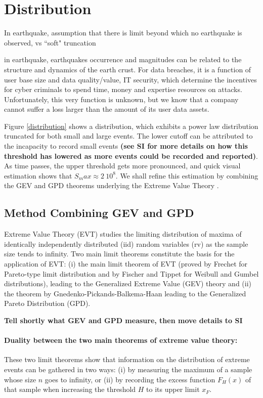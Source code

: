 \section*{Distribution}

In earthquake, assumption that there is limit beyond which no earthquake is observed, vs ``soft" truncation

in earthquake, earthquakes occurrence and magnitudes can be related to the structure and dynamics of the earth crust. For data breaches, it is a function of user base size and data quality/value, IT security, which determine the incentives for cyber criminals to spend time, money and expertise resources on attacks. Unfortunately, this very function is unknown, but we know that a company cannot suffer a loss larger than the amount of its user data assets.

Figure \ref{distribution} shows a distribution, which exhibits a power law distribution truncated for both small and large events. The lower cutoff can be attributed to the incapacity to record small events {\bf (see SI for more details on how this threshold has lowered as more events could be recorded and reported)}. As time passes, the upper threshold gets more pronounced, and quick visual estimation shows that $S_max \approx 2~10^8$. We shall refine this estimation by combining the GEV and GPD theorems underlying the Extreme Value Theory \cite{}.

\subsection*{Method Combining GEV and GPD}
Extreme Value Theory (EVT) studies the limiting distribution of maxima of identically independently distributed (iid) random variables (rv) as the sample size tends to infinity. Two main limit theorems constitute the basis for the application of EVT: (i) the main limit theorem of EVT (proved by Frechet \cite{} for Pareto-type limit distribution and by Fischer and Tippet \cite{} for Weibull and Gumbel distributions), leading to the Generalized Extreme Value (GEV) theory and (ii) the theorem by Gnedenko-Pickands-Balkema-Haan leading to the Generalized Pareto Distribution (GPD).

{\bf Tell shortly what GEV and GPD measure, then move details to SI}

\paragraph{Duality between the two main theorems of extreme value theory: }These two limit theorems show that information on the distribution of extreme events can be gathered in two ways: (i) by measuring the maximum of a sample whose size $n$ goes to infinity, or (ii) by recording the excess function $F_H(x)$ of that sample when increasing the threshold $H$ to its upper limit $x_F$.

